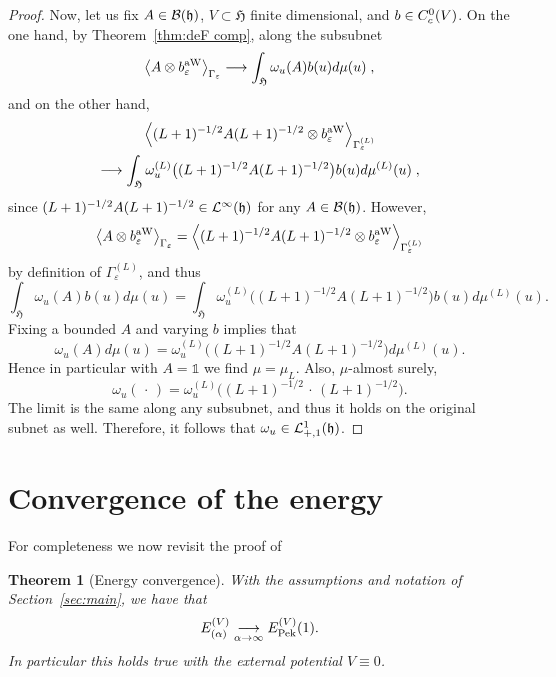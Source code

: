 \documentclass[10pt]{amsart}
\newtheorem{theo}{Theorem}[section]
\theoremstyle{definition}\newtheorem{defi}[theo]{Definition}\newtheorem{rema}[theo]{Remark}\newtheorem{exam}[theo]{Example}\newtheorem{exem}[theo]{Example}\newtheorem{nota}[theo]{Notation}
\DeclareMathOperator{\Pek}{Pek}
\DeclareMathOperator{\aww}{aW}
\newcommand{\cL}{\mathcal{L}}
\newcommand{\gH}{\mathfrak{H}}
\newcommand{\gh}{\mathfrak{h}}
\newcommand{\cB}{\mathcal{B}}
\newcommand{\1}{\mathds{1}}
\let\oldin\in
\renewcommand{\in}{\mathchoice{\oldin}{\oldin}{\,\oldin\,}{\,\oldin\,}}
\renewcommand*{\to}{\mathchoice{\longrightarrow}{\rightarrow}{\rightarrow}{\rightarrow}}
\let\originalleft\left
\let\originalright\right
\renewcommand{\left}{\mathopen{}\mathclose\bgroup\originalleft}
\renewcommand{\right}{\aftergroup\egroup\originalright}
\begin{document}
\begin{proof}
Now, let us fix $A\in \cB(\gh)$, $V\subset  \gH$ finite dimensional, and $b\in C^0_c(V)$. On the one hand, by Theorem~\ref{thm:deF comp}, along the subsubnet
\begin{equation*}
\left\langle A\otimes b^{\aww}_{\varepsilon} \right\rangle_{\Gamma_\varepsilon}\to \int_{  \gH}^{}\omega_u(A)b(u) d\mu(u)\;,
\end{equation*}
and on the other hand,
\begin{multline*}
\left\langle (L+1)^{-1/2}A(L+1)^{-1/2}\otimes b^{\aww}_{\varepsilon} \right\rangle_{\Gamma^{(L)}_\varepsilon}\\
\to \int_{\gH}^{}\omega_u^{(L)}\bigl((L+1)^{-1/2}A(L+1)^{-1/2}\bigr)b(u) d\mu^{(L)}(u)\;,
\end{multline*}
since $(L+1)^{-1/2}A(L+1)^{-1/2}\in \cL^{\infty}(\gh)$ for any $A\in
\cB(\gh)$. However,
\begin{equation*}
\left\langle A\otimes b^{\aww}_{\varepsilon} \right\rangle_{\Gamma_\varepsilon}=\left\langle (L+1)^{-1/2}A(L+1)^{-1/2}\otimes b^{\aww}_{\varepsilon} \right\rangle_{\Gamma^{(L)}_\varepsilon}
\end{equation*}
by definition of $\Gamma_{\varepsilon}^{(L)}$, and thus
\begin{equation*}
\int_{  \gH}^{}\omega_u(A)b(u) d\mu(u)=\int_{  \gH}^{}\omega_u^{(L)}\bigl((L+1)^{-1/2}A(L+1)^{-1/2}\bigr)b(u) d\mu^{(L)}(u).
\end{equation*}
Fixing a bounded $A$ and varying $b$ implies that
\[
\omega_u(A) d\mu(u) = \omega_u^{(L)}\bigl((L+1)^{-1/2}A(L+1)^{-1/2}\bigr)d\mu^{(L)}(u).
\]
Hence in particular with $A= \1$ we find $\mu= \mu_L$. Also, $\mu$-almost surely,
\begin{equation*}
\omega_u(\,\cdot\,)=\omega^{(L)}_u\bigl((L+1)^{-1/2}\,\cdot \,(L+1)^{-1/2}\bigr).
\end{equation*}
The limit is the same along any subsubnet, and thus it holds on the original subnet as well. Therefore, it follows that $\omega_u\in \cL^1_{+,1}(\gh)$.
\end{proof}

\section{Convergence of the energy}\label{sec:energy}

For completeness we now revisit the proof of

\begin{theo}[{Energy convergence}]\label{thm:ener}
With the assumptions and notation of Section~\ref{sec:main}, we have that
\begin{equation*}
E_{(\alpha)} ^{(V)} \underset{\alpha \to \infty}{\to} E^{(V)}_{\Pek}(1).
\end{equation*}
In particular this holds true with the external potential $V\equiv 0$.
\end{theo}
\end{document}
